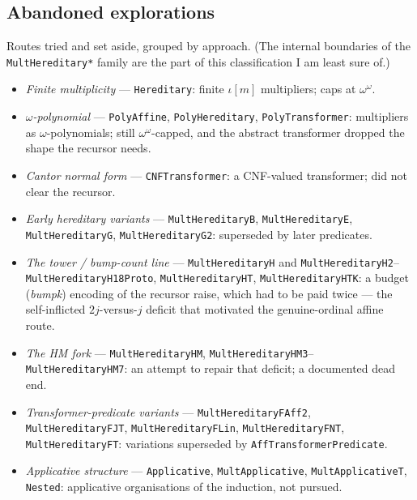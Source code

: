 \documentclass[11pt]{article}
\newcommand{\code}[1]{\texttt{#1}}
\theoremstyle{definition}
\begin{document}
\subsection{Abandoned explorations}

Routes tried and set aside, grouped by approach. (The internal boundaries of the
\code{MultHereditary*} family are the part of this classification I am least sure
of.)

\begin{itemize}
\item \emph{Finite multiplicity} --- \code{Hereditary}: finite $\iota[m]$
  multipliers; caps at $\omega^\omega$.
\item \emph{$\omega$-polynomial} --- \code{PolyAffine}, \code{PolyHereditary},
  \code{PolyTransformer}: multipliers as $\omega$-polynomials; still
  $\omega^\omega$-capped, and the abstract transformer dropped the shape the
  recursor needs.
\item \emph{Cantor normal form} --- \code{CNFTransformer}: a CNF-valued
  transformer; did not clear the recursor.
\item \emph{Early hereditary variants} --- \code{MultHereditaryB},
  \code{MultHereditaryE}, \code{MultHereditaryG}, \code{MultHereditaryG2}: superseded
  by later predicates.
\item \emph{The tower / bump-count line} --- \code{MultHereditaryH} and
  \code{MultHereditaryH2}--\code{MultHereditaryH18Proto}, \code{MultHereditaryHT},
  \code{MultHereditaryHTK}: a budget (\emph{bumpk}) encoding of the recursor
  raise, which had to be paid twice --- the self-inflicted $2j$-versus-$j$
  deficit that motivated the genuine-ordinal affine route.
\item \emph{The HM fork} --- \code{MultHereditaryHM},
  \code{MultHereditaryHM3}--\code{MultHereditaryHM7}: an attempt to repair that
  deficit; a documented dead end.
\item \emph{Transformer-predicate variants} --- \code{MultHereditaryFAff2},
  \code{MultHereditaryFJT}, \code{MultHereditaryFLin}, \code{MultHereditaryFNT},
  \code{MultHereditaryFT}: variations superseded by \code{AffTransformerPredicate}.
\item \emph{Applicative structure} --- \code{Applicative},
  \code{MultApplicative}, \code{MultApplicativeT}, \code{Nested}: applicative
  organisations of the induction, not pursued.
\end{itemize}
\end{document}
